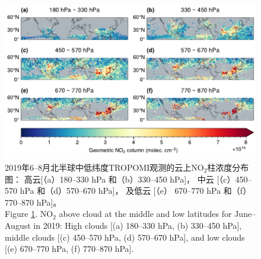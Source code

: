 \begin{figure}[!htbp]
    \centering
    \includegraphics[width=15cm]{./figures/no2geo_tropomi.pdf}
    \caption{
    2019年6--8月北半球中低纬度TROPOMI观测的云上NO$_2$柱浓度分布图：
    高云[（a）180--330 hPa 和（b）330--450 hPa]，
    中云 [（c）450--570 hPa 和（d）570--670 hPa]，
    及低云 [（e） 670--770 hPa 和（f）770--870 hPa]。 \\
    Figure \ref{fig:no2geo_tropomi}. NO$_2$ above cloud at the middle and low latitudes for June--August in 2019:
    High clouds [(a) 180--330 hPa, (b) 330--450 hPa],
    middle clouds [(c) 450--570 hPa, (d) 570--670 hPa],
    and low clouds [(e) 670--770 hPa, (f) 770--870 hPa].
    }
    \label{fig:no2geo_tropomi}
\end{figure}



